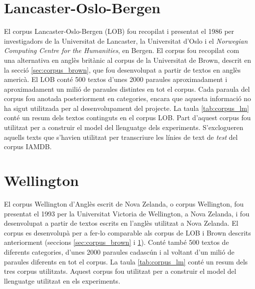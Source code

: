 \section{Lancaster-Oslo-Bergen}\label{sec:corpus_lob}
El corpus Lancaster-Oslo-Bergen (LOB) fou recopilat i presentat el 1986\cite{johansson1986tagged} per investigadors de la Universitat de Lancaster, la Universitat d'Oslo i el \emph{Norwegian Computing Centre for the Humanities}, en Bergen. El corpus fou recopilat com una alternativa en anglès britànic al corpus de la Universitat de Brown, descrit en la secció \ref{sec:corpus_brown}, que fou desenvolupat a partir de textos en anglès americà. El LOB conté 500 textos d'unes 2000 paraules aproximadament i aproximadament un milió de paraules distintes en tot el corpus. Cada paraula del corpus fou anotada posteriorment en categories, encara que aquesta informació no ha sigut utilitzada per al desenvolupament del projecte. La taula \ref{tab:corpus_lm} conté un resum dels textos continguts en el corpus LOB. Part d'aquest corpus fou utilitzat per a construir el model del llenguatge dels experiments. S'exclogueren aquells texts que s'havien utilitzat per transcriure les línies de text de \emph{test} del corpus IAMDB.


\section{Wellington}\label{sec:corpus_wellington}
El corpus Wellington d'Anglès escrit de Nova Zelanda, o corpus Wellington, fou presentat el 1993\cite{bauer1993manual} per la Universitat Victoria de Wellington, a Nova Zelanda, i fou desenvolupat a partir de textos escrits en l'anglès utilitzat a Nova Zelanda. El corpus es desenvolupà per a fer-lo comparable als corpus de LOB i Brown descrits anteriorment (seccions \ref{sec:corpus_brown} i \ref{sec:corpus_lob}). Conté també 500 textos de diferents categories, d'unes 2000 paraules cadascún i al voltant d'un milió de paraules diferents en tot el corpus. La taula \ref{tab:corpus_lm} conté un resum dels tres corpus utilitzats. Aquest corpus fou utilitzat per a construir el model del llenguatge utilitzat en els experiments.

